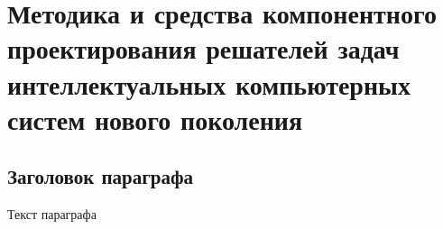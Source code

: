 
\chapter{Методика и средства компонентного проектирования решателей задач интеллектуальных компьютерных систем нового поколения}
\label{chapter_ps_design}


\section{Заголовок параграфа}
Текст параграфа

%